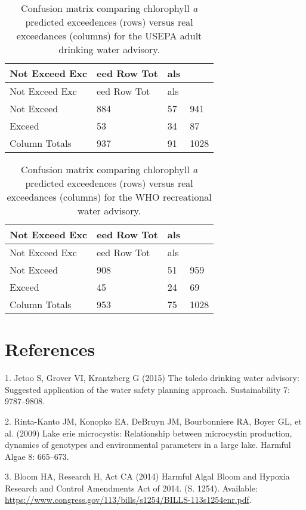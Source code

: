 \documentclass[11pt,]{article}
\begin{document}
\newpage

\begin{longtable}[c]{@{}llll@{}}
\caption{Confusion matrix comparing chlorophyll \textit{a} predicted
exceedences (rows) versus real exceedances (columns) for the USEPA adult
drinking water advisory. \label{tab:adult_conmat_table}}\tabularnewline
\toprule
Not Exceed Exc & eed Row Tot & als &\tabularnewline
\midrule
\endfirsthead
\toprule
Not Exceed Exc & eed Row Tot & als &\tabularnewline
\midrule
\endhead
Not Exceed & 884 & 57 & 941\tabularnewline
Exceed & 53 & 34 & 87\tabularnewline
Column Totals & 937 & 91 & 1028\tabularnewline
\bottomrule
\end{longtable}

\newpage

\begin{longtable}[c]{@{}llll@{}}
\caption{Confusion matrix comparing chlorophyll \textit{a} predicted
exceedences (rows) versus real exceedances (columns) for the WHO
recreational water advisory.
\label{tab:who_rec_conmat_table}}\tabularnewline
\toprule
Not Exceed Exc & eed Row Tot & als &\tabularnewline
\midrule
\endfirsthead
\toprule
Not Exceed Exc & eed Row Tot & als &\tabularnewline
\midrule
\endhead
Not Exceed & 908 & 51 & 959\tabularnewline
Exceed & 45 & 24 & 69\tabularnewline
Column Totals & 953 & 75 & 1028\tabularnewline
\bottomrule
\end{longtable}

\newpage

\section*{References}\label{references}

\hypertarget{refs}{}
\hypertarget{ref-jetoo2015toledo}{}
1. Jetoo S, Grover VI, Krantzberg G (2015) The toledo drinking water
advisory: Suggested application of the water safety planning approach.
Sustainability 7: 9787--9808.

\hypertarget{ref-rinta2009lake}{}
2. Rinta-Kanto JM, Konopko EA, DeBruyn JM, Bourbonniere RA, Boyer GL, et
al. (2009) Lake erie microcystis: Relationship between microcystin
production, dynamics of genotypes and environmental parameters in a
large lake. Harmful Algae 8: 665--673.

\hypertarget{ref-HABHRCA2014}{}
3. Bloom HA, Research H, Act CA (2014) Harmful Algal Bloom and Hypoxia
Research and Control Amendments Act of 2014. (S. 1254). Available:
\url{https://www.congress.gov/113/bills/s1254/BILLS-113s1254enr.pdf}.
\end{document}
